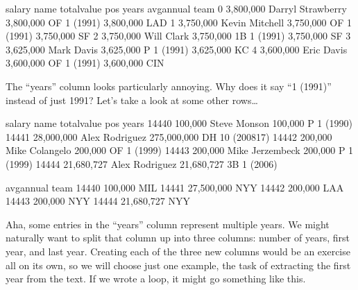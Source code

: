 \documentclass[letterpaper,10pt,english]{jupyterBook}
\begin{document}
\begin{sphinxVerbatim}[commandchars=\\\{\}]
        salary               name  total\PYGZus{}value pos     years   avg\PYGZus{}annual team
0  \PYGZdl{} 3,800,000  Darryl Strawberry  \PYGZdl{} 3,800,000  OF  1 (1991)  \PYGZdl{} 3,800,000  LAD
1  \PYGZdl{} 3,750,000     Kevin Mitchell  \PYGZdl{} 3,750,000  OF  1 (1991)  \PYGZdl{} 3,750,000   SF
2  \PYGZdl{} 3,750,000         Will Clark  \PYGZdl{} 3,750,000  1B  1 (1991)  \PYGZdl{} 3,750,000   SF
3  \PYGZdl{} 3,625,000         Mark Davis  \PYGZdl{} 3,625,000   P  1 (1991)  \PYGZdl{} 3,625,000   KC
4  \PYGZdl{} 3,600,000         Eric Davis  \PYGZdl{} 3,600,000  OF  1 (1991)  \PYGZdl{} 3,600,000  CIN
\end{sphinxVerbatim}

\sphinxAtStartPar
The “years” column looks particularly annoying.  Why does it say “1 (1991)” instead of just 1991?  Let’s take a look at some other rows…

\begin{sphinxVerbatim}[commandchars=\\\{\}]
\PYG{p}{[}\PYG{p}{]}
\end{sphinxVerbatim}

\begin{sphinxVerbatim}[commandchars=\\\{\}]
             salary             name    total\PYGZus{}value pos         years  \PYGZbs{}
14440     \PYGZdl{} 100,000     Steve Monson      \PYGZdl{} 100,000   P      1 (1990)   
14441  \PYGZdl{} 28,000,000   Alex Rodriguez  \PYGZdl{} 275,000,000  DH  10 (2008\PYGZhy{}17)   
14442     \PYGZdl{} 200,000   Mike Colangelo      \PYGZdl{} 200,000  OF      1 (1999)   
14443     \PYGZdl{} 200,000  Mike Jerzembeck      \PYGZdl{} 200,000   P      1 (1999)   
14444  \PYGZdl{} 21,680,727   Alex Rodriguez   \PYGZdl{} 21,680,727  3B      1 (2006)   

         avg\PYGZus{}annual team  
14440     \PYGZdl{} 100,000  MIL  
14441  \PYGZdl{} 27,500,000  NYY  
14442     \PYGZdl{} 200,000  LAA  
14443     \PYGZdl{} 200,000  NYY  
14444  \PYGZdl{} 21,680,727  NYY  
\end{sphinxVerbatim}

\sphinxAtStartPar
Aha, some entries in the “years” column represent multiple years.  We might naturally want to split that column up into three columns: number of years, first year, and last year.  Creating each of the three new columns would be an exercise all on its own, so we will choose just one example, the task of extracting the first year from the text.  If we wrote a loop, it might go something like this.
\end{document}
